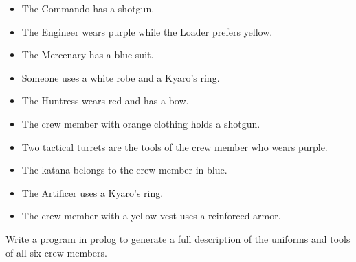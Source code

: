 \documentclass{article}
\begin{document}
\begin{itemize}
    \item The Commando has a shotgun.
    \item The Engineer wears purple while the Loader prefers yellow.
    \item The Mercenary has a blue suit.
    \item Someone uses a white robe and a Kyaro's ring.
    \item The Huntress wears red and has a bow.
    \item The crew member with orange clothing holds a shotgun.
    \item Two tactical turrets are the tools of the crew member who wears purple.
    \item The katana belongs to the crew member in blue.
    \item The Artificer uses a Kyaro's ring.
    \item The crew member with a yellow vest uses a reinforced armor.
\end{itemize}

Write a program in prolog to generate a full description of the uniforms and tools of all six crew members.
\end{document}
